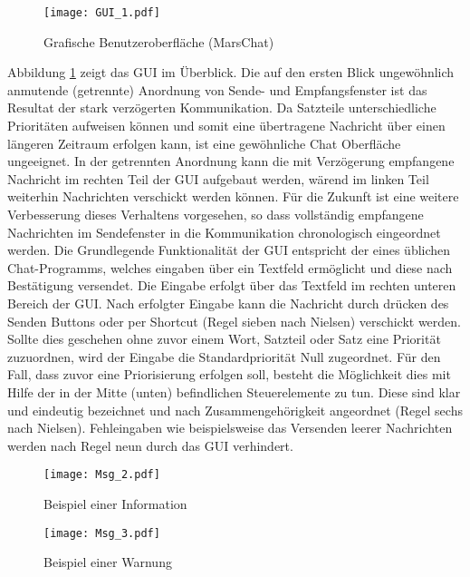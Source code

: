 \begin{figure}[H]
\centering
\texttt{[image: GUI\_1.pdf]}
\caption{Grafische Benutzeroberfläche (MarsChat)}
\label{fig:GUI}
\end{figure}

Abbildung \ref{fig:GUI} zeigt das \gls{GUI} im {\"U}berblick. Die auf den
ersten Blick ungew{\"o}hnlich anmutende (getrennte) Anordnung von Sende- und
Empfangsfenster ist das Resultat der stark verz{\"o}gerten Kommunikation. Da
Satzteile unterschiedliche Priorit{\"a}ten aufweisen k{\"o}nnen und somit eine
{\"u}bertragene Nachricht {\"u}ber einen l{\"a}ngeren Zeitraum erfolgen kann,
ist eine gew{\"o}hnliche Chat Oberfl{\"a}che ungeeignet. In der getrennten
Anordnung kann die mit Verz{\"o}gerung empfangene Nachricht im rechten Teil der
\gls{GUI} aufgebaut werden, w{\"a}rend im linken Teil weiterhin Nachrichten verschickt
werden k{\"o}nnen. F{\"u}r die Zukunft ist eine weitere Verbesserung dieses
Verhaltens vorgesehen, so dass vollst{\"a}ndig empfangene Nachrichten im
Sendefenster in die Kommunikation chronologisch eingeordnet werden. Die
Grundlegende Funktionalit{\"a}t der \gls{GUI} entspricht der eines {\"u}blichen
Chat-Programms, welches eingaben {\"u}ber ein Textfeld erm{\"o}glicht und diese
nach Best{\"a}tigung versendet. Die Eingabe erfolgt {\"u}ber das Textfeld im
rechten unteren Bereich der \gls{GUI}. Nach erfolgter Eingabe kann die Nachricht
durch dr{\"u}cken des Senden Buttons oder per Shortcut (Regel sieben nach
Nielsen) verschickt werden.
Sollte dies geschehen ohne zuvor einem Wort, Satzteil oder Satz eine
Priorit{\"a}t zuzuordnen, wird der Eingabe die Standardpriorit{\"a}t Null
zugeordnet. F{\"u}r den Fall, dass zuvor eine Priorisierung erfolgen soll,
besteht die M{\"o}glichkeit dies mit Hilfe der in der Mitte (unten) befindlichen
Steuerelemente zu tun. Diese sind klar und eindeutig bezeichnet und nach
Zusammengeh{\"o}rigkeit angeordnet (Regel sechs nach Nielsen). Fehleingaben wie
beispielsweise das Versenden leerer Nachrichten werden nach Regel neun durch das
\gls{GUI} verhindert.

\begin{figure}[H]
\centering
\texttt{[image: Msg\_2.pdf]}
\caption{Beispiel einer Information}
\label{fig:Msg2}
\end{figure}

\begin{figure}[H]
\centering
\texttt{[image: Msg\_3.pdf]}
\caption{Beispiel einer Warnung}
\label{fig:Msg3}
\end{figure}

